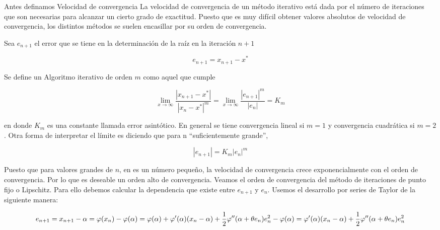 Antes definamos Velocidad de convergencia 
La velocidad de convergencia de un método  iterativo está dada por el número de  iteraciones que son
necesarias  para  alcanzar  un  cierto  grado  de  exactitud.  Puesto  que  es  muy  difícil  obtener  valores
absolutos  de  velocidad  de  convergencia,  los  distintos métodos  se  suelen  encasillar  por  su  orden  de
convergencia.

Sea $e_{n+1}$ el error que se tiene en la determinación de la raíz en la iteración $n+1$

$$e_{n+1}=x_{n+1}-x^*$$

Se define un Algoritmo iterativo de orden $m$ como aquel que cumple

$$ \displaystyle\lim_{x \to\infty}{\frac{\left |{x_{n+1} - x^*}\right |}{\left |{x_n - x^*}\right |^m}} = \displaystyle\lim_{x \to\infty}{\frac{\left |{e_{n+1}}\right |^m}{\left |{e_n}\right |}}  = K_m $$

en donde $K_m$ es una constante llamada error asintótico. En general se tiene convergencia lineal si $m = 1$ y convergencia cuadrática si $m = 2$.
Otra forma de interpretar el límite es diciendo que para n “suficientemente grande”,

$$ \left |{e_{n+1}}\right | = K_m \left |{e_n}\right |^m $$

Puesto que para valores grandes de $n$, en es un número pequeño, la velocidad de convergencia crece exponencialmente con el orden de convergencia. Por lo que es deseable un orden alto de convergencia.
Veamos el orden de convergencia del método de iteraciones de punto fijo o Lipschitz. Para ello debemos calcular la dependencia que existe entre $e_{n+1}$ y $e_n$. Usemos el desarrollo por series de Taylor de la siguiente manera:

$$ e_{n+1} \\ =  x_{n+1} - \alpha \\ =  \varphi(x_n) -  \varphi(\alpha ) \\ =  \varphi(\alpha )+ \varphi'(\alpha )(x_n - \alpha )+\frac{1}{2} \varphi''(\alpha+ \theta e_n)e_n^2 -  \varphi(\alpha ) \\ =  \varphi'(\alpha )(x_n-\alpha )+\frac{1}{2} \varphi''(\alpha +  \theta e_n)e_n^2 $$

